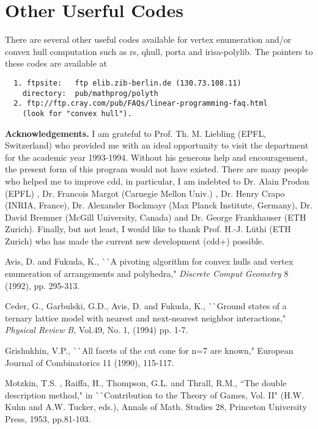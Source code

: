 \section{Other Userful Codes}  \label{CODES}
There are several other useful codes available for vertex enumeration and/or
convex hull computation  such as rs, qhull, porta and irisa-polylib.
The pointers to these codes are available at
\begin{verbatim}
  1. ftpsite:   ftp elib.zib-berlin.de (130.73.108.11)      
    directory:  pub/mathprog/polyth
  2. ftp://ftp.cray.com/pub/FAQs/linear-programming-faq.html
    (look for "convex hull").
\end{verbatim}


\bigskip
\noindent
{\large {\bf Acknowledgements.}} 
I am  grateful to Prof. Th. M. Liebling (EPFL, Switzerland)  who
provided me with an ideal opportunity to visit the department
for the academic year 1993-1994.  Without his 
generous help and encouragement,
the present form of this program would not have existed.
There are many people who helped me to improve cdd,  in particular,
I am indebted to Dr. Alain Prodon (EPFL) , Dr. Francois Margot
(Carnegie Mellon Univ.) , Dr. Henry Crapo (INRIA, France),
Dr. Alexander Bockmayr (Max Planck Institute, Germany), 
Dr. David Bremner (McGill University, Canada)  and
Dr. George Frankhauser (ETH Zurich). 
Finally, but not least, I would like to thank Prof. H.-J. L\"uthi
(ETH Zurich) who has made the current new development (cdd+)
possible.

\addtolength{\baselineskip}{-0.5\baselineskip}
\begin{thebibliography}{99}
 Avis, D.  and Fukuda, K., ^^ ^^ A pivoting algorithm
        for convex hulls and vertex enumeration of arrangements
        and polyhedra," {\em Discrete Comput Geometry} 8
        (1992), pp. 295-313.

 Ceder, G., Garbulski, G.D.,  Avis, D. and Fukuda, K., 
^^ ^^ Ground states of a ternary lattice model with nearest
and next-nearest neighbor interactions,"
{\em Physical Review B\/}, Vol.49, No. 1, (1994)  pp. 1-7.

 Grishukhin, V.P., ^^ ^^ All facets of
the cut cone for n=7 are known," European Journal of
Combinatorics 11 (1990), 115-117.

 Motzkin, T.S. , Raiffa, H.,  
Thompson, G.L. and  Thrall, R.M., ``The double description method," 
in  ^^ ^^ Contribution to the Theory of Games, Vol. II"
(H.W. Kuhn and A.W. Tucker, eds.),
Annals of Math. Studies 28,  Princeton University Press, 1953, pp.81-103.

\end{thebibliography}



